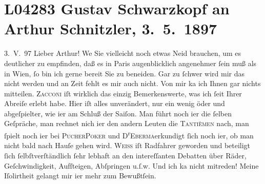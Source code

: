 

\section[Gustav Schwarzkopf an Arthur Schnitzler, 3. 5. 1897]{L04283 Gustav Schwarzkopf an Arthur Schnitzler, 3. 5. 1897}
\nopagebreak{}
\rehead{ }\normalsize\beginnumbering{}
\toendnotes[C]{\smallbreak\pagebreak[2]}
\toendnotes[C]{\smallbreak}
\pstart
           \raggedleft{}{\pb}3. V. 97\pend
           \vspace{0.5em}
\pstart
           Lieber Arthur! We{\geminationn} Sie vielleicht noch
               etwas Neid brauchen, um es deutlicher zu empfinden, daß es in Paris augenblicklich angenehmer{ }ſein muß als in Wien,{ }ſo bin ich gerne bereit Sie zu beneiden. Gar
               zu{ }ſchwer wird mir das nicht werden und an Zeit fehlt es mir auch nicht. Von mir ka{\geminationn} ich Ihnen gar nichts mitteilen. \textsc{Zacconi} iſt wirklich das einzig Bemerkenswerte, was ich{ }ſeit Ihrer Abreiſe erlebt habe.
               Hier iſt alles unverändert, nur  ein wenig öder und abgeſpielter, wie i{\geminationm}er am Schluß der Saiſon. Man führt noch i{\geminationm}er die{ }ſelben Geſpräche, man rechnet nich i{\geminationm}er den andern Leuten die \textsc{Tantièmen} nach, man{ }ſpielt noch i{\geminationm}er bei \textsc{Pucher}\textsc{Poker} und D\textsuperscript{r}\textsc{Eberma{\geminationn}}{\pb}erkundigt{ }ſich noch i{\geminationm}er, ob man nicht bald nach Hauſe gehen wird. \textsc{Weiss} iſt Radfahrer geworden und beteiligt{ }ſich{ }ſelbſtverſtändlich{ }ſehr lebhaft an
               den intereſſanten Debatten über Räder, Geſchwindigkeit, Aufſteigen, Abſpringen u.ſ.w.
               Und ich ka{\geminationn} nicht mitreden! Meine Iſolirtheit gelangt
               mir i{\geminationm}er mehr zum Bewußtſein.\pend
           
